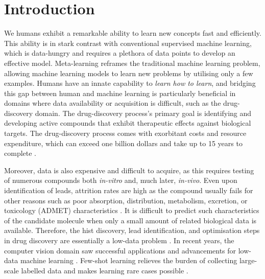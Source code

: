 \documentclass[journal=jcisd8,manuscript=article]{achemso} %
\begin{document}
\section{Introduction}

We humans exhibit a remarkable ability to learn new concepts fast and efficiently. This ability is in stark contrast with conventional supervised machine learning, which is data-hungry and requires a plethora of data points to develop an effective model. Meta-learning reframes the traditional machine learning problem, allowing machine learning models to learn new problems by utilising only a few examples. Humans have an innate capability to \textit{learn how to learn}, and bridging this gap between human and machine learning is particularly beneficial in domains where data availability or acquisition is difficult, such as the drug-discovery domain. The drug-discovery process's primary goal is identifying and developing active compounds that exhibit therapeutic effects against biological targets. The drug-discovery process comes with exorbitant costs and resource expenditure, which can exceed one billion dollars and take up to 15 years to complete \cite{hughes2011principles}.

Moreover, data is also expensive and difficult to acquire, as this requires testing of numerous compounds both \textit{in-vitro} and, much later, \textit{in-vivo}. Even upon identification of leads, attrition rates are high as the compound usually fails for other reasons such as poor absorption, distribution, metabolism, excretion, or toxicology (ADMET) characteristics \cite{waring2015analysis}. It is difficult to predict such characteristics of the candidate molecule when only a small amount of related biological data is available. Therefore, the hist discovery, lead identification, and optimisation steps in drug discovery are essentially a low-data problem \cite{altae2017low}. In recent years, the computer vision domain saw successful applications and advancements for low-data machine learning \cite{koch2015siamese, vinyals2016matching, snell2017prototypical, sung2018learning}. Few-shot learning relieves the burden of collecting large-scale labelled data and makes learning rare cases possible \cite{wang2020generalizing}. 
\end{document}

